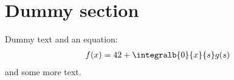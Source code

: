 \section{Dummy section}
Dummy text and an equation:
\begin{align}
    f(x) = 42 + \integralb{0}{x}{s} g(s)
\end{align}
and some more text.
